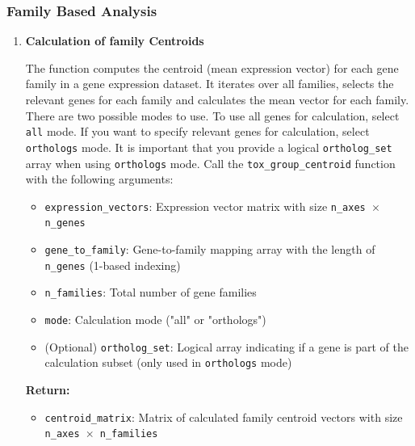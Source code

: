 \documentclass[11pt]{article}
\begin{document}
\subsubsection{Family Based Analysis}
\begin{enumerate}
	\item \textbf{Calculation of family Centroids}
	      
	      The function computes the centroid (mean expression vector) for each gene family
	      in a gene expression dataset. It iterates over all families, selects the relevant
	      genes for each family and calculates the mean vector for each family.
	      There are two possible modes to use. To use all genes for calculation,
	      select \texttt{all} mode. If you want to specify relevant genes for
	      calculation, select \texttt{orthologs} mode. It is important that you provide
	      a logical \texttt{ortholog\_set} array when using \texttt{orthologs} mode.
	      Call the \texttt{tox\_group\_centroid} function with the following arguments:
	      
	      \begin{itemize}
	      	\item \texttt{expression\_vectors}: Expression vector matrix with size \texttt{n\_axes
	      	      $\times$ n\_genes}
	      	
	      	\item \texttt{gene\_to\_family}: Gene-to-family mapping array with the length
	      	      of \texttt{n\_genes} (1-based indexing)
	      	      
	      	\item \texttt{n\_families}: Total number of gene families
	      	      
	      	\item \texttt{mode}: Calculation mode ("all" or "orthologs")
	      	      
	      	\item (Optional) \texttt{ortholog\_set}: Logical array indicating if a gene
	      	      is part of the calculation subset (only used in \texttt{orthologs} mode)
	      \end{itemize}
	      
	      \textbf{Return:}
	      \begin{itemize}
	      	\item \texttt{centroid\_matrix}: Matrix of calculated family centroid vectors
	      	      with size \texttt{n\_axes $\times$ n\_families}
	      \end{itemize}
	      

\end{enumerate}
\end{document}
